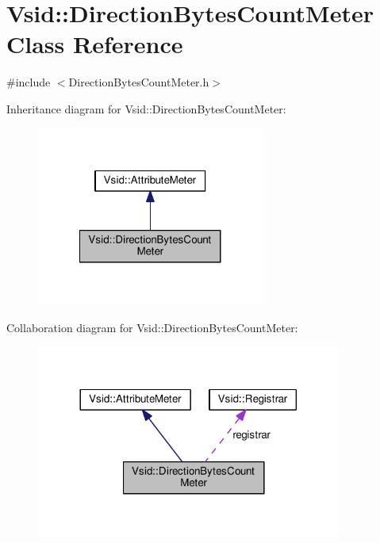 \hypertarget{class_vsid_1_1_direction_bytes_count_meter}{\section{Vsid\-:\-:Direction\-Bytes\-Count\-Meter Class Reference}
\label{class_vsid_1_1_direction_bytes_count_meter}
}


{\ttfamily \#include $<$Direction\-Bytes\-Count\-Meter.\-h$>$}



Inheritance diagram for Vsid\-:\-:Direction\-Bytes\-Count\-Meter\-:
\nopagebreak
\begin{figure}[H]
\begin{center}
\leavevmode
\includegraphics[width=212pt]{class_vsid_1_1_direction_bytes_count_meter__inherit__graph}
\end{center}
\end{figure}


Collaboration diagram for Vsid\-:\-:Direction\-Bytes\-Count\-Meter\-:
\nopagebreak
\begin{figure}[H]
\begin{center}
\leavevmode
\includegraphics[width=284pt]{class_vsid_1_1_direction_bytes_count_meter__coll__graph}
\end{center}
\end{figure}
